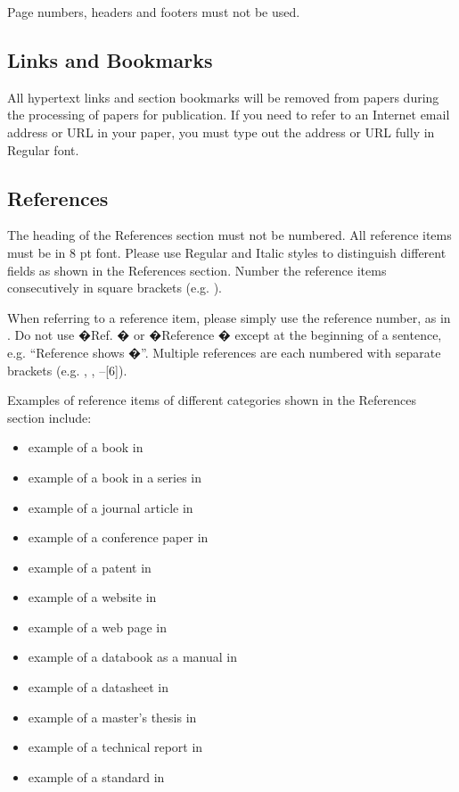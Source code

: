 \documentclass[10pt,conference,letterpaper]{IEEEtran}
\begin{document}
Page numbers, headers and footers must not be used.

\subsection{Links and Bookmarks}

All hypertext links and section bookmarks will be removed from
papers during the processing of papers for publication.  If you
need to refer to an Internet email address or URL in your paper,
you must type out the address or URL fully in Regular font.

\subsection{References}

The heading of the References section must not be numbered.
All reference items must be in 8 pt font.  Please
use Regular and Italic styles to distinguish different fields as
shown in the References section. Number the reference items
consecutively in square brackets (e.g. \cite{IEEEexample:book}).

When referring to a reference item, please simply use the
reference number, as in \cite{IEEEexample:bookwithseriesvolume}.
Do not use �Ref. \cite{IEEEexample:article_typical}� or
�Reference \cite{IEEEexample:article_typical}� except at the
beginning of a sentence, e.g.  ``Reference
\cite{IEEEexample:article_typical} shows �''.  Multiple
references are each numbered with separate brackets (e.g.
\cite{IEEEexample:bookwithseriesvolume},
\cite{IEEEexample:article_typical},
\cite{IEEEexample:confwithpaper}--[6]).

Examples of reference items of different categories shown in the
References section include:

\begin{itemize}
\item	example of a book in \cite{IEEEexample:book}
\item	example of a book in a series in \cite{IEEEexample:bookwithseriesvolume}
\item	example of a journal article in \cite{IEEEexample:article_typical}
\item	example of a conference paper in \cite{IEEEexample:confwithpaper}
\item	example of a patent in \cite{IEEEexample:uspat}
\item	example of a website in \cite{IEEEexample:IEEEwebsite}
\item	example of a web page in \cite{IEEEexample:shellCTANpage}
\item	example of a databook as a manual in \cite{IEEEexample:motmanual}
\item	example of a datasheet in \cite{IEEEexample:datasheet}
\item	example of a master's thesis in \cite{IEEEexample:masterstype}
\item	example of a technical report in \cite{IEEEexample:techreptype}
\item	example of a standard in \cite{IEEEexample:standard}
\end{itemize}
\end{document}
